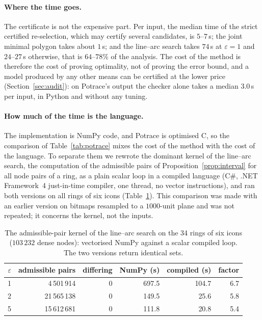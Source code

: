 \documentclass[11pt,a4paper]{article}
\theoremstyle{definition}
\theoremstyle{remark}
\begin{document}
\paragraph{Where the time goes.} The certificate is not the expensive part.
Per input, the median time of the strict certified re-selection, which may
certify several candidates, is $5$--$7$\,s; the joint minimal polygon takes
about $1$\,s; and the line--arc search takes $74$\,s at $\varepsilon=1$ and
$24$--$27$\,s otherwise, that is $64$--$78\%$ of the analysis. The cost of the
method is therefore the cost of proving optimality, not of proving the error
bound, and a model produced by any other means can be certified at the lower
price (Section~\ref{sec:audit}): on Potrace's output the checker alone takes
a median $3.0$\,s per input, in Python and without any tuning.

\paragraph{How much of the time is the language.} The implementation is
NumPy code, and Potrace is optimised C, so the comparison of
Table~\ref{tab:potrace} mixes the cost of the method with the cost of the
language. To separate them we rewrote the dominant kernel of the line--arc
search, the computation of the admissible pairs of
Proposition~\ref{prop:interval} for all node pairs of a ring, as a plain
scalar loop in a compiled language (C\#, .NET Framework~4 just-in-time
compiler, one thread, no vector instructions), and ran both versions on all
rings of six icons (Table~\ref{tab:kernel}). This comparison was made with an
earlier version on bitmaps resampled to a $1000$-unit plane and was not
repeated; it concerns the kernel, not the inputs.

\begin{table}[h]
\centering
\caption{The admissible-pair kernel of the line--arc search on the 34 rings
of six icons ($103\,232$ dense nodes): vectorised NumPy against a scalar
compiled loop. The two versions return identical sets.}
\label{tab:kernel}
\begin{tabular}{rrrrrr}
\toprule
$\varepsilon$ & admissible pairs & differing & NumPy (s) & compiled (s) & factor\\
\midrule
1 & 4\,501\,914 & 0 & 697.5 & 104.7 & 6.7\\
2 & 21\,565\,138 & 0 & 149.5 & 25.6 & 5.8\\
5 & 15\,612\,681 & 0 & 111.8 & 20.8 & 5.4\\
\bottomrule
\end{tabular}
\end{table}
\end{document}
